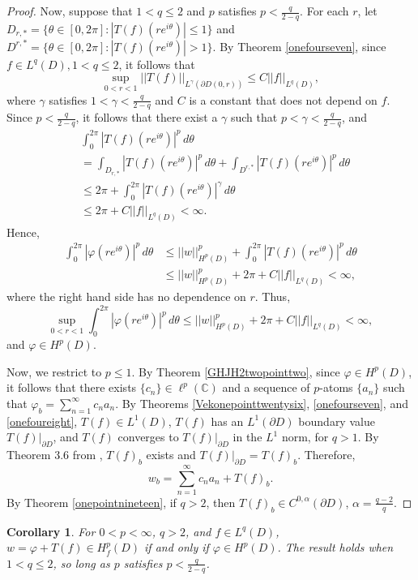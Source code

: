 \documentclass[suppldata]{interact}
\theoremstyle{plain}%
\newtheorem{corr}[theorem]{Corollary}
\theoremstyle{definition}
\theoremstyle{remark}
\newcommand{\p}{\partial}
\begin{document}
\begin{proof}
Now, suppose that $1 < q \leq 2$ and $p$ satisfies $p < \frac{q}{2-q}$. For each $r$, let $D_{r,*} = \{\theta \in [0,2\pi] : |T(f)(re^{i\theta})| \leq 1 \}$ and $D^{r,*} = \{\theta \in [0,2\pi] : |T(f)(re^{i\theta})| > 1 \}$. By Theorem \ref{onefourseven}, since $f \in L^q(D), 1 < q \leq 2$, it follows that 
\[
\sup_{0 < r < 1}||T(f)||_{L^\gamma(\p D(0,r))} \leq C ||f||_{L^q(D)},
\]
where $\gamma$ satisfies $1 < \gamma < \frac{q}{2-q}$ and $C$ is a constant that does not depend on $f$. Since $p < \frac{q}{2-q}$, it follows that there exist a $\gamma$ such that $p < \gamma < \frac{q}{2-q}$, and 
\begin{align*}
&\int_0^{2\pi} | T(f)(re^{i\theta})|^p \,d\theta \\
&= \int_{D_{r,*}} | T(f)(re^{i\theta})|^p \,d\theta + \int_{D^{r,*}} | T(f)(re^{i\theta})|^p \,d\theta \\
&\leq 2\pi + \int_0^{2\pi} | T(f)(re^{i\theta})|^\gamma \,d\theta \\
&\leq 2\pi + C||f||_{L^q(D)} < \infty.
\end{align*}
Hence, 
\begin{align*}
\int_0^{2\pi} |\varphi(re^{i\theta})|^p \,d\theta 
& \leq  ||w||^p_{H^p(D)} + \int_0^{2\pi} | T(f)(re^{i\theta})|^p \,d\theta \\
&\leq  ||w||^p_{H^p(D)} +  2\pi + C||f||_{L^q(D)} < \infty,
\end{align*}
where the right hand side has no dependence on $r$. Thus, 
\[
\sup_{0 < r < 1} \int_0^{2\pi} |\varphi(re^{i\theta})|^p \,d\theta \leq ||w||^p_{H^p(D)} +  2\pi + C||f||_{L^q(D)} < \infty,
\]
and $\varphi \in H^p(D)$. 

Now, we restrict to $p\leq 1$. By Theorem \ref{GHJH2twopointtwo}, since $\varphi \in H^p(D)$, it follows that there exists $\{c_n\} \in \ell^p(\mathbb{C})$  and a sequence of $p$-atoms $\{a_n\}$ such that $\varphi_b = \sum_{n=1}^\infty c_n a_n$. By Theorems \ref{Vekonepointtwentysix}, \ref{onefourseven}, and \ref{onefoureight}, $T(f) \in L^1(D)$, $T(f)$ has an $L^1(\p D)$ boundary value $T(f)|_{\p D}$, and $T(f)$ converges to $T(f)|_{\p D}$ in the $L^1$ norm, for $q>1$. By Theorem 3.6 from \cite{WB3}, $T(f)_b$ exists and $T(f)|_{\p D} = T(f)_b$. Therefore, 
\[
    w_b = \sum_{n=1}^\infty c_n a_n + T(f)_b.
\]
By Theorem \ref{onepointnineteen}, if $q>2$, then $T(f)_b \in C^{0,\alpha}(\p D)$, $\alpha = \frac{q-2}{q}$. 

\end{proof}

\begin{corr}\label{genhardyrepcorr}
    For $0 < p < \infty$, $q > 2$, and $f \in L^q(D)$, $w = \varphi + T(f) \in H^p_f(D)$ if and only if $\varphi \in H^p(D)$. The result holds when $1 < q \leq 2$, so long as $p$ satisfies $p < \frac{q}{2-q}$.
\end{corr}
\end{document}
